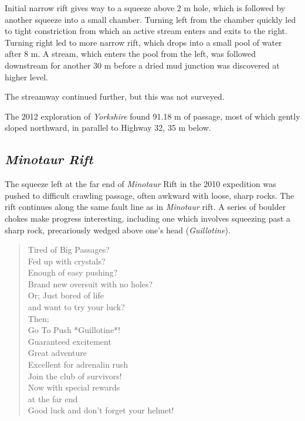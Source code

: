 Initial narrow rift gives way to a squeeze above 2 m hole, which is
followed by another squeeze into a small chamber. Turning left from the
chamber quickly led to tight constriction from which an active stream
enters and exits to the right. Turning right led to more narrow rift,
which drops into a small pool of water after 8 m. A stream, which enters
the pool from the left, was followed downstream for another 30 m before
a dried mud junction was discovered at higher level.

The streamway continued further, but this was not surveyed.

The 2012 exploration of \emph{Yorkshire} found 91.18 m of passage, most
of which gently sloped northward, in parallel to Highway 32, 35 m below.

\hypertarget{minotaur-rift}{%
\subsection{\texorpdfstring{\emph{Minotaur
Rift}}{Minotaur Rift}}\label{minotaur-rift}}

The squeeze left at the far end of \emph{Minotaur} Rift in the 2010
expedition was pushed to difficult crawling passage, often awkward with
loose, sharp rocks. The rift continues along the same fault line as in
\emph{Minotaur} rift. A series of boulder chokes make progress
interesting, including one which involves squeezing past a sharp rock,
precariously wedged above one's head (\emph{Guillotine}).

\begin{verse}
Tired of Big Passages? \\
Fed up with crystals? \\
Enough of easy pushing? \\
Brand new oversuit with no holes? \\

Or; Just bored of life \\
   and want to try your luck? \\

Then; \\ 

Go To Push *Guillotine*! \\

Guaranteed excitement \\
Great adventure \\
Excellent for adrenalin rush \\

Join the club of survivors! \\

Now with special rewards \\
at the far end \\

Good luck and don't forget your helmet!
\end{verse}

